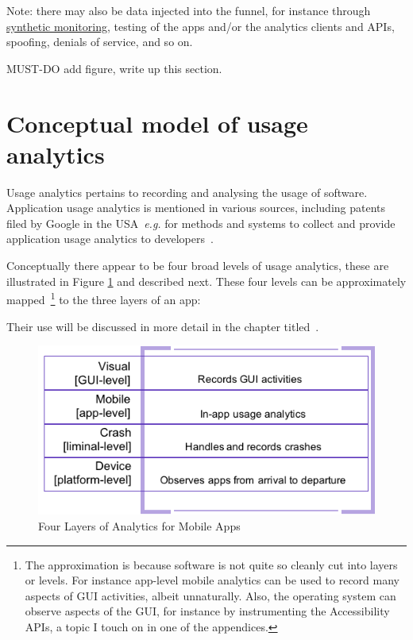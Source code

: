 Note: there may also be data injected into the funnel, for instance through \href{https://en.wikipedia.org/wiki/Synthetic_monitoring}{synthetic monitoring}, testing of the apps and/or the analytics clients and APIs, spoofing, denials of service, and so on. 

MUST-DO add figure, write up this section.




\section{Conceptual model of usage analytics}
Usage analytics pertains to recording and analysing the usage of software. Application usage analytics is mentioned in various sources, including patents filed by Google in the USA~\emph{e.g.} for methods and systems to collect and provide application usage analytics to developers~\citep{googlepatent_hyman2016_collecting_application_usage_analytics}. 

Conceptually there appear to be four broad levels of usage analytics, these are illustrated in Figure \ref{fig:four-layers-of-analytics-for-mobile-apps} and described next. These four levels can be approximately mapped~\footnote{The approximation is because software is not quite so cleanly cut into layers or levels. For instance app-level mobile analytics can be used to record many aspects of GUI activities, albeit unnaturally. Also, the operating system can observe aspects of the GUI, for instance by instrumenting the Accessibility APIs, a topic I touch on in one of the appendices.} to the three layers of an app:


Their use will be discussed in more detail in the chapter titled~\href{chapter-applying-analytics-to-development-practices}{\emph{}}. %

\begin{figure}[htbp!]
    \centering
    \includegraphics[width=12cm]{images/4-layers-of-analytics.png}
    \caption{Four Layers of Analytics for Mobile Apps}
    \label{fig:four-layers-of-analytics-for-mobile-apps}
\end{figure}

